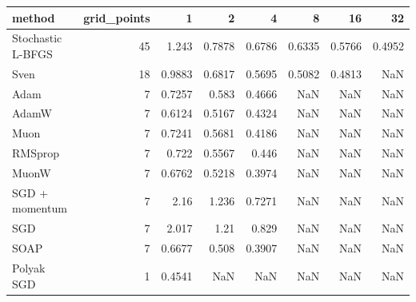 \begin{tabular}{lrrrrrrr}
\toprule
method & grid\_points & 1 & 2 & 4 & 8 & 16 & 32 \\
\midrule
Stochastic L-BFGS & 45 & 1.243 & 0.7878 & 0.6786 & 0.6335 & 0.5766 & 0.4952 \\
Sven & 18 & 0.9883 & 0.6817 & 0.5695 & 0.5082 & 0.4813 & NaN \\
Adam & 7 & 0.7257 & 0.583 & 0.4666 & NaN & NaN & NaN \\
AdamW & 7 & 0.6124 & 0.5167 & 0.4324 & NaN & NaN & NaN \\
Muon & 7 & 0.7241 & 0.5681 & 0.4186 & NaN & NaN & NaN \\
RMSprop & 7 & 0.722 & 0.5567 & 0.446 & NaN & NaN & NaN \\
MuonW & 7 & 0.6762 & 0.5218 & 0.3974 & NaN & NaN & NaN \\
SGD + momentum & 7 & 2.16 & 1.236 & 0.7271 & NaN & NaN & NaN \\
SGD & 7 & 2.017 & 1.21 & 0.829 & NaN & NaN & NaN \\
SOAP & 7 & 0.6677 & 0.508 & 0.3907 & NaN & NaN & NaN \\
Polyak SGD & 1 & 0.4541 & NaN & NaN & NaN & NaN & NaN \\
\bottomrule
\end{tabular}

